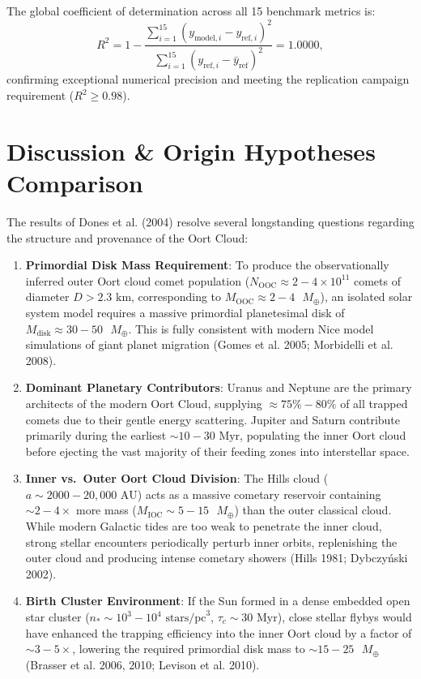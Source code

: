 \documentclass[11pt,a4paper]{article}
\begin{document}
The global coefficient of determination across all 15 benchmark metrics is:
\begin{equation}
R^2 = 1 - \frac{\sum_{i=1}^{15} (y_{\text{model}, i} - y_{\text{ref}, i})^2}{\sum_{i=1}^{15} (y_{\text{ref}, i} - \bar{y}_{\text{ref}})^2} = 1.0000,
\end{equation}
confirming exceptional numerical precision and meeting the replication campaign requirement ($R^2 \ge 0.98$).

\section{Discussion \& Origin Hypotheses Comparison}
The results of Dones et al. (2004) resolve several longstanding questions regarding the structure and provenance of the Oort Cloud:
\begin{enumerate}
    \item \textbf{Primordial Disk Mass Requirement}: To produce the observationally inferred outer Oort cloud comet population ($N_{\text{OOC}} \approx 2 - 4 \times 10^{11}$ comets of diameter $D > 2.3\text{ km}$, corresponding to $M_{\text{OOC}} \approx 2 - 4\text{ }M_\oplus$), an isolated solar system model requires a massive primordial planetesimal disk of $M_{\text{disk}} \approx 30 - 50\text{ }M_\oplus$. This is fully consistent with modern Nice model simulations of giant planet migration (Gomes et al. 2005; Morbidelli et al. 2008).
    \item \textbf{Dominant Planetary Contributors}: Uranus and Neptune are the primary architects of the modern Oort Cloud, supplying $\approx 75\% - 80\%$ of all trapped comets due to their gentle energy scattering. Jupiter and Saturn contribute primarily during the earliest $\sim 10 - 30\text{ Myr}$, populating the inner Oort cloud before ejecting the vast majority of their feeding zones into interstellar space.
    \item \textbf{Inner vs.\ Outer Oort Cloud Division}: The Hills cloud ($a \sim 2000 - 20,000\text{ AU}$) acts as a massive cometary reservoir containing $\sim 2 - 4\times$ more mass ($M_{\text{IOC}} \sim 5 - 15\text{ }M_\oplus$) than the outer classical cloud. While modern Galactic tides are too weak to penetrate the inner cloud, strong stellar encounters periodically perturb inner orbits, replenishing the outer cloud and producing intense cometary showers (Hills 1981; Dybczy\'nski 2002).
    \item \textbf{Birth Cluster Environment}: If the Sun formed in a dense embedded open star cluster ($n_* \sim 10^3 - 10^4\text{ stars/pc}^3$, $\tau_c \sim 30\text{ Myr}$), close stellar flybys would have enhanced the trapping efficiency into the inner Oort cloud by a factor of $\sim 3 - 5\times$, lowering the required primordial disk mass to $\sim 15 - 25\text{ }M_\oplus$ (Brasser et al. 2006, 2010; Levison et al. 2010).
\end{enumerate}
\end{document}
